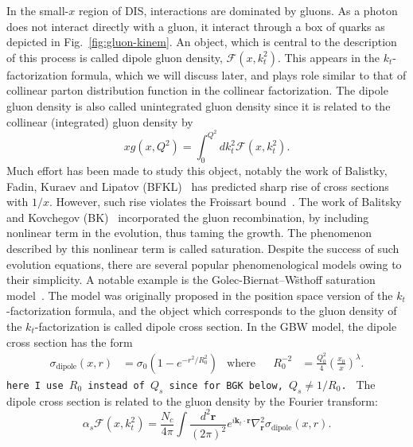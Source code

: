 \documentclass[11pt]{article}
\numberwithin{equation}{section}
\numberwithin{table}{section}
\numberwithin{figure}{section}
\newcommand{\comment}[1]{\texttt{\color{red}#1}}
\begin{document}
In the small-$x$ region of DIS, interactions are dominated by gluons\cite{Kovchegov:2012mbw}. As a photon does not interact directly with a gluon, it interact through a box of quarks as depicted in Fig.~\ref{fig:gluon-kinem}. 
An object, which is central to the description of this process is called dipole gluon density, $\mathcal{F}(x,k_t^2)$.   This appears in the $k_t$-factorization formula, which we will discuss later,  and plays role similar to that of collinear parton distribution function in the collinear factorization.
The dipole gluon density is also called unintegrated gluon density since it is related to the collinear (integrated) gluon density by
\begin{equation}
xg(x,Q^2)=\int^{Q^2}_0 dk_t^2 \mathcal{F}(x,k^2_t).
\end{equation}
Much effort has been made to study this object, notably the work of Balistky, Fadin, Kuraev and Lipatov (BFKL)~\cite{Balitsky:1978ic, Kuraev:1977fs} has predicted sharp rise of cross sections with $1/x$.  However, such rise violates the Froissart bound~\cite{Kovchegov:2012mbw}. The work of Balitsky and Kovchegov (BK)~\cite{Balitsky:1995ub,Kovchegov:1999yj} incorporated the gluon recombination, by including nonlinear term in the evolution, thus taming the growth. The phenomenon described by this nonlinear term is called saturation.
Despite the success of such evolution equations, there are several popular phenomenological models owing to their simplicity. A notable example is the Golec-Biernat--W\"sthoff saturation model~\cite{Golec-Biernat:1998zce}. The model was originally proposed in the position space version of the $k_t$-factorization formula, and the object which corresponds to the gluon density of the $k_t$-factorization is called dipole cross section.
In the GBW model, the dipole cross section has the form~\cite{Golec-Biernat:1998zce}
\begin{align}
\sigma_{\mathrm{dipole}}(x,r)&=\sigma_0\left(1-e^{-r^2/R^2_0}\right)&\mathrm{where}&
&R^{-2}_0&=\frac{Q_0^{2}}{4}\left(\frac{x_0}{x}\right)^\lambda.
\end{align}
\comment{here I use $R_0$ instead of $Q_s$ since for BGK below, $Q_s\neq 1/R_0$. }
The dipole cross section is related to the gluon density by the Fourier transform: 
\begin{equation}
\alpha_s\mathcal{F}(x,k_t^2)=\frac{N_c}{4\pi}\int\frac{d^2\mathbf{r}}{(2\pi)^2}e^{i\mathbf{k}_t\cdot \mathbf{r} }\nabla_{\mathbf{r}}^2\sigma_{\mathrm{dipole}}(x,r).
\label{eq:dipole-gluon}
\end{equation}
\end{document}
